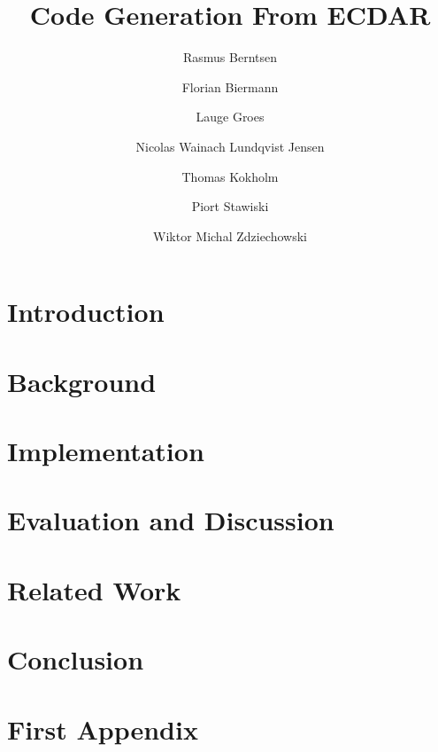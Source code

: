 \documentclass{llncs}
\begin{document}
%
\frontmatter          %
\pagestyle{headings}  %
%
\mainmatter              %
%
\title{Code Generation From ECDAR}
%
%
\author{Rasmus Berntsen \and Florian Biermann \and Lauge Groes \and Nicolas Wainach Lundqvist Jensen \and Thomas Kokholm \and Piort Stawiski \and Wiktor Michal Zdziechowski}



\maketitle %

\begin{abstract}

\end{abstract}


\section{Introduction}
\label{introduction}



\section{Background}
\label{background}



\section{Implementation}
\label{implementation}



\section{Evaluation and Discussion}
\label{evaluation}



\section{Related Work}
\label{related}



\section{Conclusion}



\nocite{*}


\appendix
\section{First Appendix}
\end{document}
